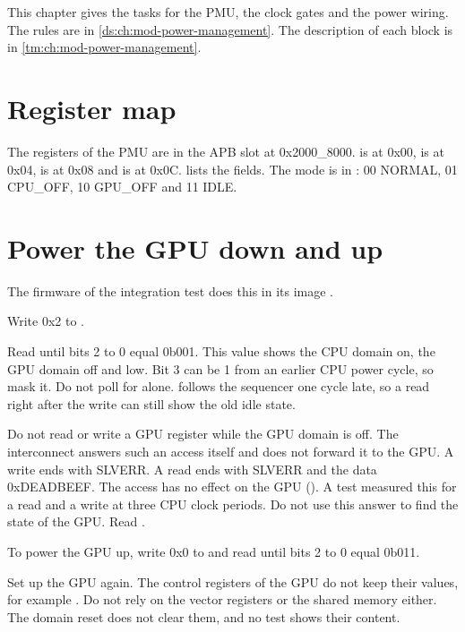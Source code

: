 This chapter gives the tasks for the PMU, the clock gates and the power wiring. The rules are in \cref{ds:ch:mod-power-management}. The description of each block is in \cref{tm:ch:mod-power-management}.

\section{Register map}\label{um:ch:power-integration:registers}
The registers of the PMU are in the APB slot at 0x2000\_8000.  is at 0x00,  is at 0x04,  is at 0x08 and  is at 0x0C.  lists the fields. The mode is in : 00 NORMAL, 01 CPU\_OFF, 10 GPU\_OFF and 11 IDLE.

\section{Power the GPU down and up}\label{um:ch:power-integration:gpu}
The firmware of the integration test  does this in its image .

\begin{procedure}
  \item Write 0x2 to .
  \item Read  until bits 2 to 0 equal 0b001. This value shows the CPU domain on, the GPU domain off and  low. Bit 3 can be 1 from an earlier CPU power cycle, so mask it. Do not poll for  alone.  follows the sequencer one cycle late, so a read right after the write can still show the old idle state.
  \item Do not read or write a GPU register while the GPU domain is off. The interconnect answers such an access itself and does not forward it to the GPU. A write ends with SLVERR. A read ends with SLVERR and the data 0xDEADBEEF. The access has no effect on the GPU (). A test measured this for a read and a write at three CPU clock periods. Do not use this answer to find the state of the GPU. Read .
  \item To power the GPU up, write 0x0 to  and read  until bits 2 to 0 equal 0b011.
  \item Set up the GPU again. The control registers of the GPU do not keep their values, for example . Do not rely on the vector registers or the shared memory either. The domain reset does not clear them, and no test shows their content.
\end{procedure}


